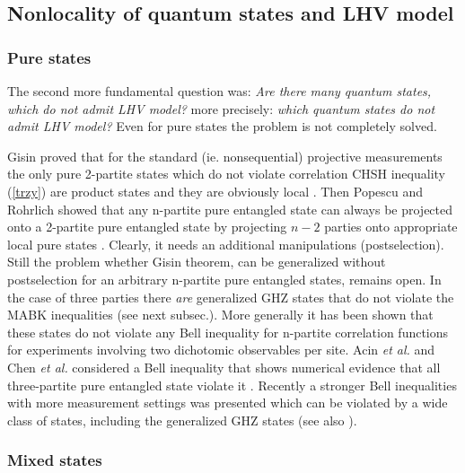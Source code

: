 \documentclass[rmp,12pt,preprint]{revtex4-2}
\begin{document}
\subsection {Nonlocality of quantum states and LHV model}

\subsubsection{Pure states}
\label{subsec:pure}

The second more fundamental question was: {\it Are there many quantum
  states, which do not admit LHV model?} more precisely: {\it which quantum states do not admit LHV model?}
  Even for pure states the problem is not completely solved.

Gisin proved that for the standard (ie. nonsequential) projective
measurements the only pure 2-partite states which do not violate correlation CHSH inequality
(\ref{trzy}) are product states and they are obviously local \cite
{Gisin,GisinP1992}. Then Popescu and Rohrlich showed that any n-partite pure entangled state can always be projected onto a 2-partite pure entangled state by projecting $n-2$ parties onto appropriate local pure states \cite {Popescu}. Clearly, it needs
an additional manipulations (postselection). Still the problem whether Gisin theorem, can be generalized without postselection for an arbitrary n-partite pure entangled states, remains open. In the case of three parties there {\it are} generalized GHZ states \cite {ZukowskiW,Scarani} that do not violate the MABK inequalities \cite {M,Ardehali,Belinskii} (see next subsec.). More generally it has been shown \cite {ZukowskiW} that these states do not violate any Bell inequality for n-partite correlation functions for experiments involving two dichotomic observables per site. Acin {\it et al.} and Chen {\it et al.} considered a Bell inequality that shows numerical evidence that all three-partite pure entangled state violate it \cite {AcinCGKKOZ2004,ChenWKO2004}.
 Recently a stronger Bell inequalities with more measurement settings was presented \cite {LaskowskiPZB2004,WuZ2003} which can be violated by a wide class of states, including the generalized GHZ states (see also \cite{ChenAF2006}).

\subsubsection{Mixed states}
\label{subsec:Mixed}
\end{document}
